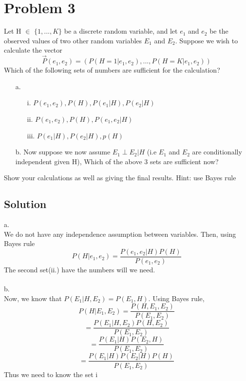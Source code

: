 \documentclass[a4 paper]{article}
\numberwithin{equation}{section}
\newcommand{\0}{\mathbf{0}}
\begin{document}
\section*{Problem 3}
Let H $\in$ $\{1,...,K\}$ be a discrete random variable, and let $e_1$ and $e_2$ be the observed values of two other random variables $E_1$ and $E_2$. Suppose we wish to calculate the vector
\begin{equation}
\overrightarrow{P}(e_1,e_2) = (P(H=1|e_1,e_2),...,P(H=K|e_1,e_2))
\end{equation}
Which of the following sets of numbers are sufficient for the calculation?
\begin{itemize}
\item[a.]\begin{itemize}
           \item[i.] $P(e_1,e_2), P(H), P(e_1|H), P(e_2|H)$
           \item[ii.] $P(e_1,e_2), P(H), P(e_1,e_2|H)$
           \item[iii.] $P(e_1|H), P(e_2|H), p(H)$
         \end{itemize}
\item[b.] Now suppose we now assume $E_1 \perp E_2|H$ (i.e $E_1$ and $E_2$ are conditionally independent given H), Which of the above 3 sets are sufficient now?
\end{itemize}
Show your calculations as well as giving the final results. Hint: use Bayes rule
\subsection*{Solution}
$ $\\
a.\\
We do not have any independence assumption between variables. Then, using Bayes rule 
\begin{equation}
P(H|e_1,e_2) = \frac{P(e_1,e_2|H)P(H)}{P(e_1,e_2)}
\end{equation}
The second set(ii.) have the numbers will we need.\\\\
b.\\
Now, we know that $P(E_1|H,E_2) = P(E_1, H)$. Using Bayes rule,
\begin{equation}
P(H|E_1,E_2) = \frac{P(H,E_1,E_2)}{P(E_1,E_2)}
\end{equation}
\begin{equation}
=\frac{P(E_1|H,E_2)P(H,E_2)}{P(E_1,E_2)}
\end{equation}
\begin{equation}
=\frac{P(E_1|H)P(E_2,H)}{P(E_1,E_2)}
\end{equation}
\begin{equation}
=\frac{P(E_1|H)P(E_2|H)P(H)}{P(E_1,E_2)}
\end{equation}
Thus we need to know the set i
%
%
%
%
\newpage
\end{document}
